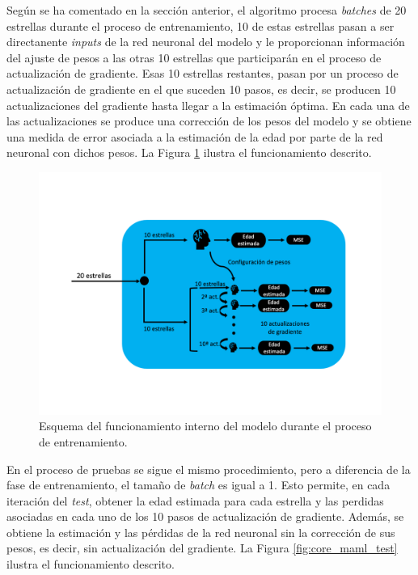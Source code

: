 Según se ha comentado en la sección anterior, el algoritmo procesa \emph{batches} de 20 estrellas durante el proceso de entrenamiento, 10 de estas estrellas pasan a ser directanente \emph{inputs} de la red neuronal del modelo y le proporcionan información del ajuste de pesos a las otras 10 estrellas que participarán en el proceso de actualización de gradiente. Esas 10 estrellas restantes, pasan por un proceso de actualización de gradiente en el que suceden 10 pasos, es decir, se producen 10 actualizaciones del gradiente hasta llegar a la estimación óptima. En cada una de las actualizaciones se produce una corrección de los pesos del modelo y se obtiene una medida de error asociada a la estimación de la edad por parte de la red neuronal con dichos pesos. La Figura \ref{fig:core_maml_train} ilustra el funcionamiento descrito.

\begin{figure}[H]
\begin{center}
 \includegraphics[width=0.8\linewidth]{Figuras/MAML/maml_core_train.pdf}
\end{center}
\caption{Esquema del funcionamiento interno del modelo durante el proceso de entrenamiento.}
 \label{fig:core_maml_train}
\end{figure}

En el proceso de pruebas se sigue el mismo procedimiento, pero a diferencia de la fase de entrenamiento, el tamaño de \emph{batch} es igual a 1. Esto permite, en cada iteración del \emph{test}, obtener la edad estimada para cada estrella y las perdidas asociadas en cada uno de los 10 pasos de actualización de gradiente. Además, se obtiene la estimación y las pérdidas de la red neuronal sin la corrección de sus pesos, es decir, sin actualización del gradiente. La Figura \ref{fig:core_maml_test} ilustra el funcionamiento descrito.

